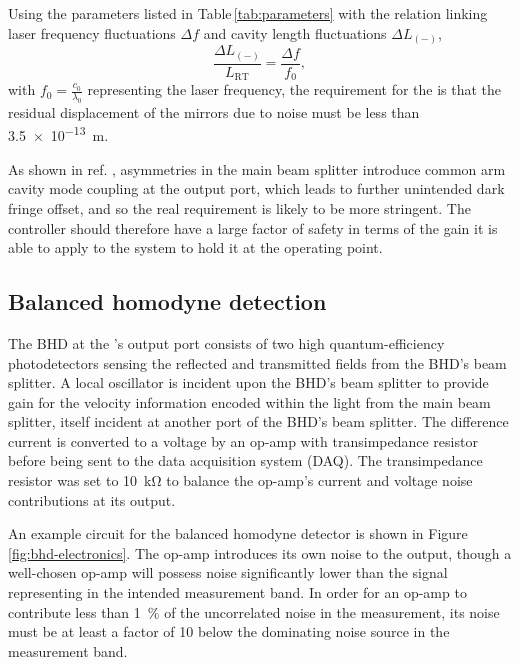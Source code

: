 Using the parameters listed in Table\,\ref{tab:parameters} with the relation linking laser frequency fluctuations $\Delta f$ and cavity length fluctuations $\Delta L_{\left(-\right)}$,
\begin{equation}
  \frac{\Delta L_{\left(-\right)}}{L_{\textrm{RT}}} = \frac{\Delta f}{f_{0}},
\end{equation}
with $f_{0} = \frac{c_{0}}{\lambda_{0}}$ representing the laser frequency, the requirement for the \SSMEXPT{} is that the residual displacement of the mirrors due to noise must be less than \SI{3.5e-13}{\meter}.

As shown in ref. \cite{Danilishin2015}, asymmetries in the main beam splitter introduce common arm cavity mode coupling at the output port, which leads to further unintended dark fringe offset, and so the real requirement is likely to be more stringent. The controller should therefore have a large factor of safety in terms of the gain it is able to apply to the system to hold it at the operating point.

\subsection{\label{sec:bhd}Balanced homodyne detection}
     
The \gls{BHD} at the \SSMEXPT{}'s output port consists of two high quantum-efficiency photodetectors sensing the reflected and transmitted fields from the \gls{BHD}'s beam splitter. A local oscillator is incident upon the \gls{BHD}'s beam splitter to provide gain for the velocity information encoded within the light from the main beam splitter, itself incident at another port of the \gls{BHD}'s beam splitter. The difference current is converted to a voltage by an op-amp with transimpedance resistor \RT{} before being sent to the data acquisition system (\gls{DAQ}). The transimpedance resistor was set to \SI{10}{\kilo\ohm} to balance the op-amp's current and voltage noise contributions at its output.

An example circuit for the balanced homodyne detector is shown in Figure\,\ref{fig:bhd-electronics}. The op-amp introduces its own noise to the output, though a well-chosen op-amp will possess noise significantly lower than the signal representing \LMINUS{} in the intended measurement band. In order for an op-amp to contribute less than \SI{1}{\percent} of the uncorrelated noise in the measurement, its noise must be at least a factor of \SI{10}{} below the dominating noise source in the measurement band.

